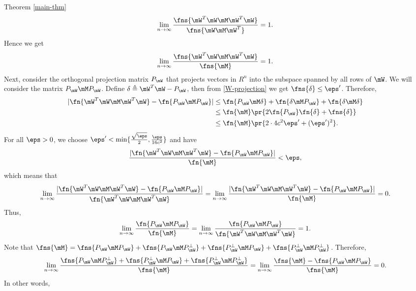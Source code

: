 \begin{proofof}{Theorem \cref{main-thm}}
\begin{equation}
    \lim_{n\to\infty}\frac{\fns{\mW^T\mW\mM \mW^T\mW}}{\fns{\mW\mM \mW^T}}=1.
\end{equation}
Hence we get
\begin{equation}
    \lim_{n\to\infty}\frac{\fns{\mW^T\mW\mM \mW^T\mW}}{\fns{\mM }}=1.
\end{equation}
Next, consider the orthogonal projection matrix $P_\mW$ that projects vectors in $R^n$ into the subspace spanned by all rows of $\mW$. We will consider the matrix $P_\mW\mM P_\mW$. Define $\delta\triangleq \mW^T\mW-P_\mW$, then from \cref{W-projection} we get $\fns{\delta}\leq\eps'$. Therefore,
\begin{equation}\begin{split}
    |\fn{\mW^T\mW\mM \mW^T\mW} - \fn{P_\mW\mM P_\mW}| &\leq \fn{P_\mW\mM \delta} + \fn{\delta \mM P_\mW} + \fn{\delta \mM \delta}\\
                                    &\leq \fn{\mM }\pr{2\fn{P_\mW}\fn{\delta}+\fns{\delta}}\\
                                    &\leq \fn{\mM }\pr{2\cdot 4c^2\eps'+(\eps')^2}.
\end{split}\end{equation}
For all $\eps>0$, we choose $\eps'<\min\{\frac{\sqrt{\eps}}{2},\frac{\eps}{16c^2}\}$ and have
\begin{equation}
    \frac{|\fn{\mW^T\mW\mM \mW^T\mW} - \fn{P_\mW\mM P_\mW}|}{\fn{\mM }} < \eps,
\end{equation}
which means that
\begin{equation}
    \lim_{n\to\infty}\frac{|\fn{\mW^T\mW\mM \mW^T\mW} - \fn{P_\mW\mM P_\mW}|}{\fn{\mW^T\mW\mM \mW^T\mW}}=\lim_{n\to\infty}\frac{|\fn{\mW^T\mW\mM \mW^T\mW} - \fn{P_\mW\mM P_\mW}|}{\fn{\mM }}=0.
\end{equation}
Thus,
\begin{equation}
    \lim_{n\to\infty}\frac{\fn{P_\mW\mM P_\mW}}{\fn{\mM }}=\lim_{n\to\infty}\frac{\fn{P_\mW\mM P_\mW}}{\fn{\mW^T\mW\mM \mW^T\mW}}=1.
\end{equation}
Note that $\fns{\mM }=\fns{P_\mW\mM P_\mW}+\fns{P_\mW\mM P_\mW^\perp}+\fns{P_\mW^\perp \mM P_\mW}+\fns{P_\mW^\perp \mM P_\mW^\perp}$. Therefore, 
\begin{equation}
    \lim_{n\to\infty}\frac{\fns{P_\mW\mM P_\mW^\perp}+\fns{P_\mW^\perp \mM P_\mW}+\fns{P_\mW^\perp \mM P_\mW^\perp}}{\fns{\mM }}=\lim_{n\to\infty}\frac{\fns{\mM }-\fns{P_\mW\mM P_\mW}}{\fns{\mM }}=0.
\end{equation}
In other words,
\begin{equation}

\end{equation}
\end{proofof}
